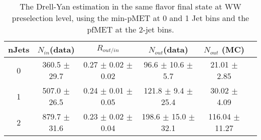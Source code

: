 \begin{table}[!hbt]
\begin{center}
\begin{tabular}{c c c c c c}
\hline
       nJets & $N_{in}$(data)        & $R_{out/in}$        & $N_{out}$(data)  & $N_{out}$ (MC) \\ 
\hline
 0 & 360.5 $\pm$ 29.7 & 0.27 $\pm$ 0.02 $\pm$ 0.02 & 96.6 $\pm$ 10.6 $\pm$ 5.7 & 21.01 $\pm$ 2.85 \\
 1 & 507.0 $\pm$ 26.5 & 0.24 $\pm$ 0.01 $\pm$ 0.05 & 121.8 $\pm$ 9.4 $\pm$ 25.4  & 30.02 $\pm$ 4.09 \\
 2 & 879.7 $\pm$ 31.6 & 0.23 $\pm$ 0.02 $\pm$ 0.04 & 198.6 $\pm$ 15.0 $\pm$ 32.1  & 116.04 $\pm$ 11.27 \\
\hline
\end{tabular}
\caption{The Drell-Yan estimation in the same flavor final state at WW preselection level, using the min-pMET at 
0 and 1 Jet bins and the pfMET at the 2-jet bins. }
\label{tab:dy_wwlevel}
\end{center}
\end{table}


